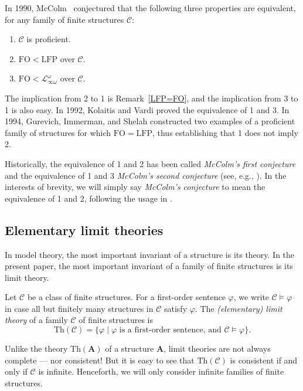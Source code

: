\documentclass{lmcs}
\newcommand{\Th}{\mathrm{Th}}
\newcommand{\LFP}{\mathrm{LFP}}
\newcommand{\FO}{\mathrm{FO}}
\newcommand{\A}{\mathbf{A}}
\theoremstyle{thmC}
\begin{document}
In 1990, McColm~\cite{McC} conjectured that the following
three properties are equivalent, for any family of finite structures $\mathcal{C}$: 
\begin{enumerate}
\item $\mathcal{C}$ is proficient. 
\item $\FO < \LFP$ over $\mathcal{C}$. 
\item $\FO < \mathcal{L}_{\infty\omega}^{\omega}$ over $\mathcal{C}$. 
\end{enumerate}
The implication from 2 to 1 is Remark~\ref{LFP=FO}, and the implication from 3 to 1 is also easy. In 1992, Kolaitis and Vardi \cite{KV} proved the equivalence
of 1 and 3. In 1994, Gurevich, Immerman, and Shelah \cite{GIS}
constructed two examples of a proficient family of structures for
which $\FO = \LFP$, thus establishing that 1 does not imply 2.

Historically, the equivalence of 1 and 2 has been called \emph{McColm's first conjecture} and the equivalence of 1 and 3 \emph{McColm's second conjecture} (see, e.g., \cite{KV}). In the interests of brevity, we will simply say \emph{McColm's conjecture} to mean the equivalence of 1 and 2, following the usage in \cite{GIS}. 

\subsection{Elementary limit theories}

In model theory, the most important invariant of a structure is its theory. In the present paper, the most important invariant of a family of finite structures is its limit theory.

\begin{defi} Let $\mathcal{C}$ be a class of finite structures. For a first-order sentence $\varphi$, we write $\mathcal{C} \models \varphi$ in case all but finitely many structures in $\mathcal{C}$ satisfy $\varphi$. The \emph{(elementary) limit theory} of a family $\mathcal{C}$ of finite structures is \[\Th(\mathcal{C}) = \{\varphi\mid \varphi\text{ is a first-order sentence, and }\mathcal{C}\models \varphi\}.\]
\end{defi}

Unlike the theory $\Th(\A)$ of a structure $\A$, limit theories are not always complete --- nor consistent! But it is easy to see that $\Th(\mathcal{C})$ is consistent if and only if $\mathcal{C}$ is infinite.
Henceforth, we will only consider infinite families of finite structures. 
\end{document}
